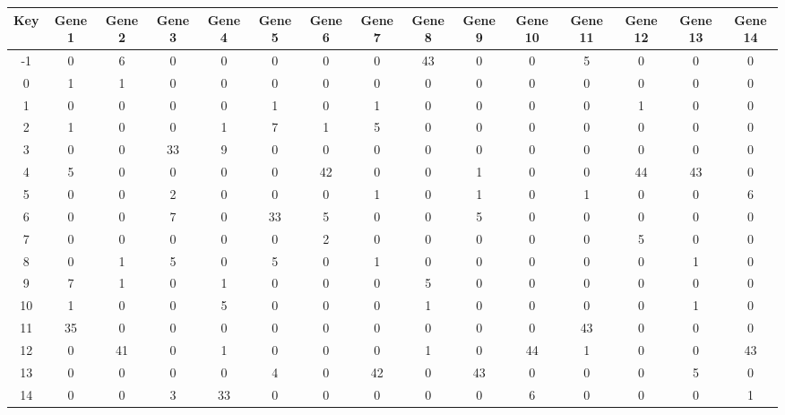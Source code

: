 \begin{tabular}{|c|c|c|c|c|c|c|c|c|c|c|c|c|c|c|}
\hline
Key & Gene 1 & Gene 2 & Gene 3 & Gene 4 & Gene 5 & Gene 6 & Gene 7 & Gene 8 & Gene 9 & Gene 10 & Gene 11 & Gene 12 & Gene 13 & Gene 14 \\
\hline
-1 & 0 & 6 & 0 & 0 & 0 & 0 & 0 & 43 & 0 & 0 & 5 & 0 & 0 & 0 \\
0 & 1 & 1 & 0 & 0 & 0 & 0 & 0 & 0 & 0 & 0 & 0 & 0 & 0 & 0 \\
1 & 0 & 0 & 0 & 0 & 1 & 0 & 1 & 0 & 0 & 0 & 0 & 1 & 0 & 0 \\
2 & 1 & 0 & 0 & 1 & 7 & 1 & 5 & 0 & 0 & 0 & 0 & 0 & 0 & 0 \\
3 & 0 & 0 & 33 & 9 & 0 & 0 & 0 & 0 & 0 & 0 & 0 & 0 & 0 & 0 \\
4 & 5 & 0 & 0 & 0 & 0 & 42 & 0 & 0 & 1 & 0 & 0 & 44 & 43 & 0 \\
5 & 0 & 0 & 2 & 0 & 0 & 0 & 1 & 0 & 1 & 0 & 1 & 0 & 0 & 6 \\
6 & 0 & 0 & 7 & 0 & 33 & 5 & 0 & 0 & 5 & 0 & 0 & 0 & 0 & 0 \\
7 & 0 & 0 & 0 & 0 & 0 & 2 & 0 & 0 & 0 & 0 & 0 & 5 & 0 & 0 \\
8 & 0 & 1 & 5 & 0 & 5 & 0 & 1 & 0 & 0 & 0 & 0 & 0 & 1 & 0 \\
9 & 7 & 1 & 0 & 1 & 0 & 0 & 0 & 5 & 0 & 0 & 0 & 0 & 0 & 0 \\
10 & 1 & 0 & 0 & 5 & 0 & 0 & 0 & 1 & 0 & 0 & 0 & 0 & 1 & 0 \\
11 & 35 & 0 & 0 & 0 & 0 & 0 & 0 & 0 & 0 & 0 & 43 & 0 & 0 & 0 \\
12 & 0 & 41 & 0 & 1 & 0 & 0 & 0 & 1 & 0 & 44 & 1 & 0 & 0 & 43 \\
13 & 0 & 0 & 0 & 0 & 4 & 0 & 42 & 0 & 43 & 0 & 0 & 0 & 5 & 0 \\
14 & 0 & 0 & 3 & 33 & 0 & 0 & 0 & 0 & 0 & 6 & 0 & 0 & 0 & 1 \\
\hline
\end{tabular}